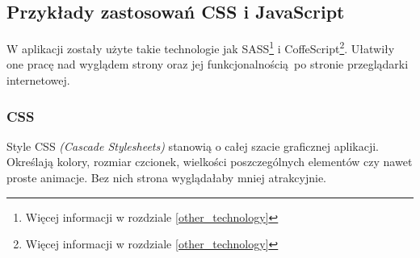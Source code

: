     

    \subsection{Przykłady zastosowań CSS i JavaScript}
      W aplikacji zostały użyte takie technologie jak SASS\footnote{Więcej informacji w rozdziale \ref{other_technology}} i CoffeScript\footnote{Więcej informacji w rozdziale \ref{other_technology}}. Ułatwiły one pracę nad wyglądem strony oraz jej funkcjonalnością po stronie przeglądarki internetowej.\\

      \subsubsection{CSS}
        Style CSS \emph{(Cascade Stylesheets)} stanowią o całej szacie graficznej aplikacji. Określają kolory, rozmiar czcionek, wielkości poszczególnych elementów czy nawet proste animacje. Bez nich strona wyglądałaby mniej atrakcyjnie.
